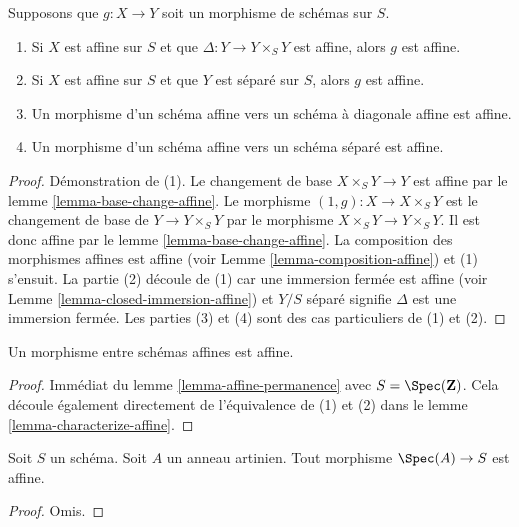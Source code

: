 \begin{lemma}
\label{lemma-affine-permanence}
Supposons que $g : X \to Y$ soit un morphisme de schémas sur $S$.
\begin{enumerate}
\item Si $X$ est affine sur $S$ et que $\Delta : Y \to Y \times_S Y$ est affine, alors $g$
est affine.
\item Si $X$ est affine sur $S$ et que $Y$ est séparé sur $S$, alors
$g$ est affine.
\item Un morphisme d'un schéma affine vers un schéma à diagonale
affine est affine.
\item Un morphisme d'un schéma affine vers un schéma séparé est affine.
\end{enumerate}
\end{lemma}

\begin{proof}
Démonstration de (1). Le changement de base $X \times_S Y \to Y$ est affine
par le lemme \ref{lemma-base-change-affine}. Le morphisme
$(1, g) : X \to X \times_S Y$ est le changement de base de $Y \to Y \times_S Y$
par le morphisme $X \times_S Y \to Y \times_S Y$. Il est donc affine par le lemme
\ref{lemma-base-change-affine}. La
composition des morphismes affines
est affine (voir Lemme \ref{lemma-composition-affine})
et (1) s'ensuit. La partie (2) découle de (1) car une
immersion fermée est affine (voir Lemme \ref{lemma-closed-immersion-affine})
et $Y/S$ séparé signifie $\Delta$ est une immersion
fermée. Les parties (3) et (4) sont des cas particuliers
de (1) et (2).
\end{proof}

\begin{lemma}
\label{lemma-morphism-affines-affine}
Un morphisme entre schémas affines est affine.
\end{lemma}

\begin{proof}
Immédiat du lemme \ref{lemma-affine-permanence} avec $S = \Spec(\mathbf{Z})$.
Cela découle également directement de l'équivalence
de (1) et (2) dans le lemme \ref{lemma-characterize-affine}.
\end{proof}

\begin{lemma}
\label{lemma-Artinian-affine}
Soit $S$ un schéma.
Soit $A$ un anneau artinien.
Tout morphisme $\Spec(A) \to S$ est affine.
\end{lemma}

\begin{proof}
Omis.
\end{proof}

